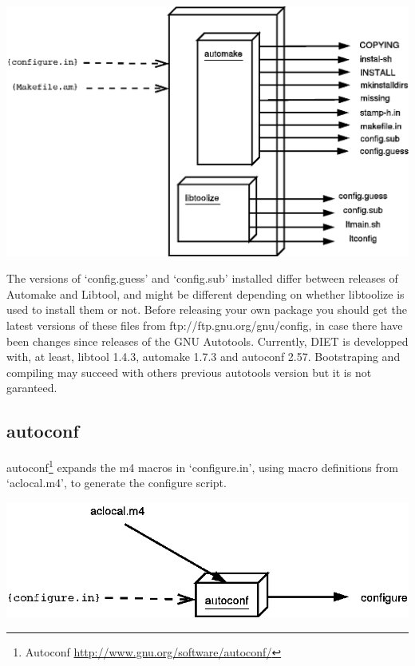 \begin{center}
\includegraphics[scale=.35]{fig/DiagrammeAutomakeLibtoolize}
\end{center}

The versions of `config.guess' and `config.sub' installed differ between 
releases of Automake and Libtool, and might be different depending on whether 
libtoolize is used to install them or not. Before releasing your own package 
you should get the latest versions of these files from ftp://ftp.gnu.org/gnu/config,
in case there have been changes since releases of the GNU Autotools.
Currently, DIET is developped with, at least, libtool 1.4.3, automake 1.7.3 and 
autoconf 2.57. Bootstraping and compiling may succeed with others previous autotools version
but it is not garanteed.


\subsection{autoconf}
autoconf\footnote{Autoconf {\url{http://www.gnu.org/software/autoconf/}}} expands the m4 macros in `configure.in', using macro 
definitions from `aclocal.m4', to generate the configure script.
\begin{center}
\includegraphics[scale=.35]{fig/DiagrammeAutoconf}
\end{center}

